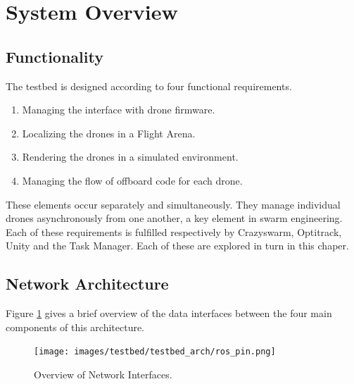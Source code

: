 

\pagebreak
\section{System Overview} 


\subsection{Functionality}
The testbed is designed according to four functional requirements. 

\begin{enumerate}
    \item	Managing the interface with drone firmware.
    \item	Localizing the drones in a Flight Arena.
    \item	Rendering the drones in a simulated environment.
    \item	Managing the flow of offboard code for each drone.
\end{enumerate}

These elements occur separately and simultaneously. They manage individual drones asynchronously from one another, a key element in swarm engineering. Each of these requirements is fulfilled respectively by Crazyswarm, Optitrack, Unity and the Task Manager. Each of these are explored in turn in this chaper.

\subsection{Network Architecture} \label{section:network}

Figure \ref{fig:network_interfaces} gives a brief overview of the data interfaces between the four main components of this architecture.
 
\begin{figure}[h]
    \raggedright
    \texttt{[image: images/testbed/testbed\_arch/ros\_pin.png]}
    \caption{Overview of Network Interfaces.}
    \label{fig:network_interfaces}
\end{figure}

